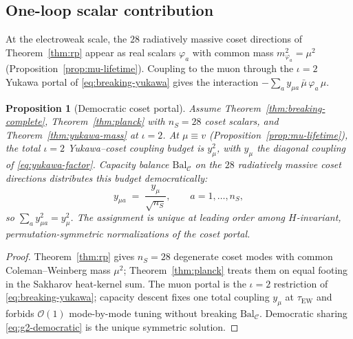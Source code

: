 \documentclass[11pt]{article}
\theoremstyle{plain}
\newtheorem{proposition}[theorem]{Proposition}
\theoremstyle{definition}
\theoremstyle{remark}
\numberwithin{equation}{section}
\begin{document}
\subsection{One-loop scalar contribution}
\label{sec:g2:oneloop}

At the electroweak scale, the $28$ radiatively massive coset directions of
Theorem~\ref{thm:rp} appear as real scalars $\varphi_a$ with common mass
$m_{\varphi_a}^2=\mu^2$ (Proposition~\ref{prop:mu-lifetime}). Coupling to the
muon through the $\iota=2$ Yukawa portal of \eqref{eq:breaking-yukawa} gives
the interaction $-\sum_a y_{\mu a}\,\bar\mu\,\varphi_a\,\mu$.

\begin{proposition}[Democratic coset portal]\label{prop:g2-democratic}
Assume Theorem~\ref{thm:breaking-complete}, Theorem~\ref{thm:planck} with
$n_S=28$ coset scalars, and Theorem~\ref{thm:yukawa-mass} at $\iota=2$.
At $\mu\equiv v$ (Proposition~\ref{prop:mu-lifetime}), the total
$\iota=2$ Yukawa--coset coupling budget is $y_\mu^2$, with $y_\mu$ the
diagonal coupling of \eqref{eq:yukawa-factor}. Capacity balance
$\mathrm{Bal}_{\mathcal{C}}$ on the $28$ radiatively massive coset directions
distributes this budget democratically:
\begin{equation}\label{eq:g2-democratic}
  y_{\mu a}
  \;=\;
  \frac{y_\mu}{\sqrt{n_S}},
  \qquad
  a=1,\ldots,n_S,
\end{equation}
so $\sum_a y_{\mu a}^2=y_\mu^2$. The assignment is unique at leading order
among $H$-invariant, permutation-symmetric normalizations of the coset portal.
\end{proposition}

\begin{proof}
Theorem~\ref{thm:rp} gives $n_S=28$ degenerate coset modes with common
Coleman--Weinberg mass $\mu^2$; Theorem~\ref{thm:planck} treats them on equal
footing in the Sakharov heat-kernel sum. The muon portal is the
$\iota=2$ restriction of \eqref{eq:breaking-yukawa}; capacity descent fixes
one total coupling $y_\mu$ at $\tau_{\mathrm{EW}}$ and forbids
$\mathcal{O}(1)$ mode-by-mode tuning without breaking
$\mathrm{Bal}_{\mathcal{C}}$. Democratic sharing
\eqref{eq:g2-democratic} is the unique symmetric solution.
\end{proof}
\end{document}
